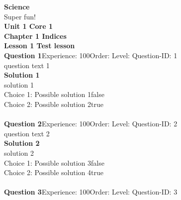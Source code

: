 \documentclass{article}
\begin{document}
\noindent\Huge{\textbf{Science}}\\[5pt]
\noindent\large{Super fun!}\\[20pt]
\noindent\huge{\textbf{Unit 1 Core 1}}\\[18pt]
\noindent\huge{\textbf{Chapter 1 Indices}}\\[15pt]
\noindent\huge{\textbf{Lesson 1 Test lesson}}\\[12pt]
\noindent\textbf{Question 1}\hspace{20pt}Experience: 100\hspace{20pt}Order: \hspace{20pt}Level: \hspace{20pt}Question-ID: 1\\[2pt]
question text 1\\[4pt]
\noindent\textbf{Solution 1}\\[2pt]
solution 1\\[4pt]
Choice 1: \hspace{20pt}Possible solution 1\hspace{20pt}false\\
Choice 2: \hspace{20pt}Possible solution 2\hspace{20pt}true\\
\\[4pt]
\noindent\textbf{Question 2}\hspace{20pt}Experience: 100\hspace{20pt}Order: \hspace{20pt}Level: \hspace{20pt}Question-ID: 2\\[2pt]
question text 2\\[4pt]
\noindent\textbf{Solution 2}\\[2pt]
solution 2\\[4pt]
Choice 1: \hspace{20pt}Possible solution 3\hspace{20pt}false\\
Choice 2: \hspace{20pt}Possible solution 4\hspace{20pt}true\\
\\[4pt]
\noindent\textbf{Question 3}\hspace{20pt}Experience: 100\hspace{20pt}Order: \hspace{20pt}Level: \hspace{20pt}Question-ID: 3\\[2pt]
\end{document}
